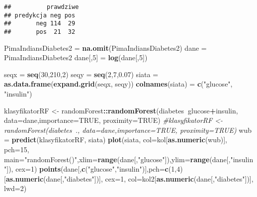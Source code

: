 \documentclass[polish,]{book}
\newenvironment{Shaded}{\begin{snugshade}}{\end{snugshade}}
\newcommand{\CommentTok}[1]{\textcolor[rgb]{0.56,0.35,0.01}{\textit{#1}}}
\newcommand{\DataTypeTok}[1]{\textcolor[rgb]{0.13,0.29,0.53}{#1}}
\newcommand{\DecValTok}[1]{\textcolor[rgb]{0.00,0.00,0.81}{#1}}
\newcommand{\FloatTok}[1]{\textcolor[rgb]{0.00,0.00,0.81}{#1}}
\newcommand{\KeywordTok}[1]{\textcolor[rgb]{0.13,0.29,0.53}{\textbf{#1}}}
\newcommand{\NormalTok}[1]{#1}
\newcommand{\OperatorTok}[1]{\textcolor[rgb]{0.81,0.36,0.00}{\textbf{#1}}}
\newcommand{\OtherTok}[1]{\textcolor[rgb]{0.56,0.35,0.01}{#1}}
\newcommand{\StringTok}[1]{\textcolor[rgb]{0.31,0.60,0.02}{#1}}
\begin{document}
\begin{verbatim}
##          prawdziwe
## predykcja neg pos
##       neg 114  29
##       pos  21  32
\end{verbatim}

\begin{Shaded}
\begin{Highlighting}[]
\NormalTok{PimaIndiansDiabetes2 =}\StringTok{ }\KeywordTok{na.omit}\NormalTok{(PimaIndiansDiabetes2)}
\NormalTok{dane =}\StringTok{ }\NormalTok{PimaIndiansDiabetes2}
\NormalTok{dane[,}\DecValTok{5}\NormalTok{] =}\StringTok{ }\KeywordTok{log}\NormalTok{(dane[,}\DecValTok{5}\NormalTok{])}

\NormalTok{seqx =}\StringTok{ }\KeywordTok{seq}\NormalTok{(}\DecValTok{30}\NormalTok{,}\DecValTok{210}\NormalTok{,}\DecValTok{2}\NormalTok{)}
\NormalTok{seqy =}\StringTok{ }\KeywordTok{seq}\NormalTok{(}\DecValTok{2}\NormalTok{,}\DecValTok{7}\NormalTok{,}\FloatTok{0.07}\NormalTok{)}
\NormalTok{siata =}\StringTok{ }\KeywordTok{as.data.frame}\NormalTok{(}\KeywordTok{expand.grid}\NormalTok{(seqx, seqy))}
\KeywordTok{colnames}\NormalTok{(siata) =}\StringTok{ }\KeywordTok{c}\NormalTok{(}\StringTok{"glucose"}\NormalTok{, }\StringTok{"insulin"}\NormalTok{)}

\NormalTok{klasyfikatorRF <-}\StringTok{ }\NormalTok{randomForest}\OperatorTok{::}\KeywordTok{randomForest}\NormalTok{(diabetes}\OperatorTok{~}\NormalTok{glucose}\OperatorTok{+}\NormalTok{insulin,}
                                             \DataTypeTok{data=}\NormalTok{dane,}\DataTypeTok{importance=}\OtherTok{TRUE}\NormalTok{, }\DataTypeTok{proximity=}\OtherTok{TRUE}\NormalTok{)}
\CommentTok{#klasyfikatorRF <- randomForest(diabetes~., data=dane,importance=TRUE, proximity=TRUE)}
\NormalTok{wub =}\StringTok{ }\KeywordTok{predict}\NormalTok{(klasyfikatorRF, siata)}
\KeywordTok{plot}\NormalTok{(siata, }\DataTypeTok{col=}\NormalTok{kol[}\KeywordTok{as.numeric}\NormalTok{(wub)], }\DataTypeTok{pch=}\DecValTok{15}\NormalTok{, }
     \DataTypeTok{main=}\StringTok{"randomForest()"}\NormalTok{,}\DataTypeTok{xlim=}\KeywordTok{range}\NormalTok{(dane[,}\StringTok{"glucose"}\NormalTok{]),}\DataTypeTok{ylim=}\KeywordTok{range}\NormalTok{(dane[,}\StringTok{"insulin"}\NormalTok{]),}
     \DataTypeTok{cex=}\DecValTok{1}\NormalTok{)}
\KeywordTok{points}\NormalTok{(dane[,}\KeywordTok{c}\NormalTok{(}\StringTok{"glucose"}\NormalTok{,}\StringTok{"insulin"}\NormalTok{)],}\DataTypeTok{pch=}\KeywordTok{c}\NormalTok{(}\DecValTok{1}\NormalTok{,}\DecValTok{4}\NormalTok{)[}\KeywordTok{as.numeric}\NormalTok{(dane[,}\StringTok{"diabetes"}\NormalTok{])], }
       \DataTypeTok{cex=}\DecValTok{1}\NormalTok{, }\DataTypeTok{col=}\NormalTok{kol2[}\KeywordTok{as.numeric}\NormalTok{(dane[,}\StringTok{"diabetes"}\NormalTok{])], }\DataTypeTok{lwd=}\DecValTok{2}\NormalTok{)}
\end{Highlighting}
\end{Shaded}
\end{document}

